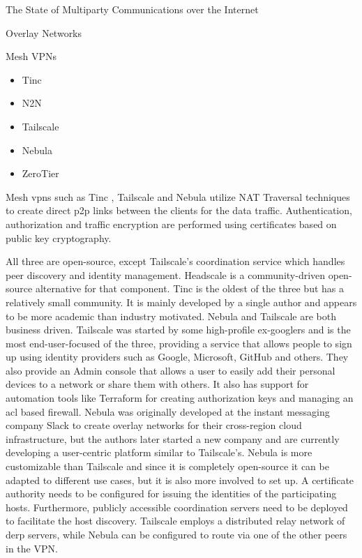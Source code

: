 \begin{frame}[fragile]{The State of Multiparty Communications over the
Internet}
\begin{block}{Overlay Networks}
\begin{block}{Mesh VPNs}
\protect\hypertarget{mesh-vpns}{}
\begin{itemize}
\tightlist
\item
  Tinc
\item
  N2N
\item
  Tailscale
\item
  Nebula
\item
  ZeroTier
\end{itemize}

Mesh \glspl{vpn} such as Tinc \autocite{tincDocs}, Tailscale
\autocite{tailscaleDocs} and Nebula \autocite{nebulaDocs} utilize NAT
Traversal techniques to create direct \gls{p2p} links between the
clients for the data traffic. Authentication, authorization and traffic
encryption are performed using certificates based on public key
cryptography.

All three are open-source, except Tailscale's coordination service which
handles peer discovery and identity management. Headscale
\autocite{fontJuanfontHeadscale2022} is a community-driven open-source
alternative for that component. Tinc is the oldest of the three but has
a relatively small community. It is mainly developed by a single author
and appears to be more academic than industry motivated. Nebula and
Tailscale are both business driven. Tailscale was started by some
high-profile ex-googlers and is the most end-user-focused of the three,
providing a service that allows people to sign up using identity
providers such as Google, Microsoft, GitHub and others. They also
provide an Admin console that allows a user to easily add their personal
devices to a network or share them with others. It also has support for
automation tools like Terraform for creating authorization keys and
managing an \gls{acl} based firewall. Nebula was originally developed at
the instant messaging company Slack to create overlay networks for their
cross-region cloud infrastructure, but the authors later started a new
company and are currently developing a user-centric platform similar to
Tailscale's. Nebula is more customizable than Tailscale and since it is
completely open-source it can be adapted to different use cases, but it
is also more involved to set up. A certificate authority needs to be
configured for issuing the identities of the participating hosts.
Furthermore, publicly accessible coordination servers need to be
deployed to facilitate the host discovery. Tailscale employs a
distributed relay network of \gls{derp} servers, while Nebula can be
configured to route via one of the other peers in the VPN.
\end{block}


\end{block}
\end{frame}
